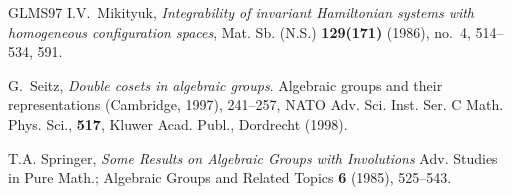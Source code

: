\documentclass[12pt]{amsart}
\numberwithin{equation}{section}
\theoremstyle{definition}
\begin{document}
\begin{thebibliography}{GLMS97}
 I.V.~Mikityuk, \emph{Integrability of invariant
    Hamiltonian systems with homogeneous configuration spaces},
  Mat. Sb. (N.S.) \textbf{129(171)} (1986), no.~4, 514--534, 591.




 G.~Seitz, \emph{Double cosets in algebraic
    groups}.  Algebraic groups and their representations (Cambridge,
  1997), 241--257, NATO Adv. Sci. Inst. Ser. C Math. Phys. Sci.,
  \textbf{517}, Kluwer Acad. Publ., Dordrecht (1998).



 T.A. Springer, \emph{Some Results on
    Algebraic Groups with Involutions} Adv. Studies in Pure Math.;
  Algebraic Groups and Related Topics \textbf{6} (1985), 525--543.





\end{thebibliography}
\end{document}
